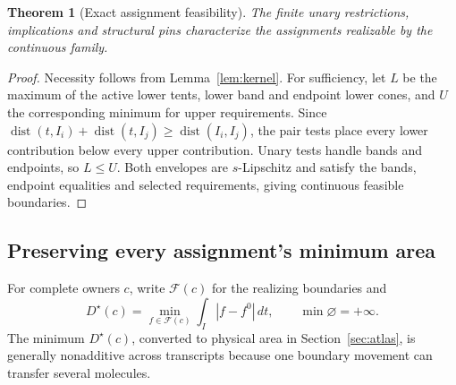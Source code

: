 \documentclass[10pt,letterpaper]{article}
\newtheorem{theorem}{Theorem}
\newcommand{\dist}{\operatorname{dist}}
\begin{document}
\begin{theorem}[Exact assignment feasibility]\label{thm:feas}
The finite unary restrictions, implications and structural pins characterize the assignments realizable by the continuous family.
\end{theorem}
\begin{proof}
Necessity follows from Lemma~\ref{lem:kernel}. For sufficiency, let $L$ be the maximum of the active lower tents, lower band and endpoint lower cones, and $U$ the corresponding minimum for upper requirements. Since $\dist(t,I_i)+\dist(t,I_j)\ge\dist(I_i,I_j)$, the pair tests place every lower contribution below every upper contribution. Unary tests handle bands and endpoints, so $L\le U$. Both envelopes are $s$-Lipschitz and satisfy the bands, endpoint equalities and selected requirements, giving continuous feasible boundaries.
\end{proof}

\subsection{Preserving every assignment's minimum area}
For complete owners $c$, write $\mathcal F(c)$ for the realizing boundaries and
\begin{equation}
 D^\star(c)=\min_{f\in\mathcal F(c)}\int_I|f-f^0|\,dt,\qquad \min\varnothing=+\infty.\label{eq:dstar}
\end{equation}
The minimum $D^\star(c)$, converted to physical area in Section~\ref{sec:atlas}, is generally nonadditive across transcripts because one boundary movement can transfer several molecules.
\end{document}

